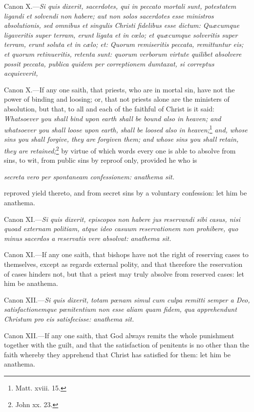 Canon X.—\emph{Si quis dixerit, sacerdotes, qui in peccato mortali sunt, potestatem ligandi et solvendi non habere; aut non solos sacerdotes esse ministros absolutionis, sed omnibus et singulis Christi fidelibus esse dictum: Quæcumque ligaveritis super terram, erunt ligata et in cœlo; et quæcumque solveritis super terram, erunt soluta et in cælo; et: Quorum remiseritis peccata, remittuntur eis; et quorum retinueritis, retenta sunt: quorum verborum virtute quilibet absolvere possit peccata, publica quidem per correptionem dumtaxat, si correptus acquieverit, }

Canon X.—If any one saith, that priests, who are in mortal sin, have not the power of binding and loosing; or, that not priests alone are the ministers of absolution, but that, to all and each of the faithful of Christ is it said: \emph{Whatsoever you shall bind upon earth shall be bound also in heaven; and whatsoever you shall loose upon earth, shall be loosed also in heaven;}\footnote{\par   Matt. xviii. 15.} \emph{and, whose sins you shall forgive, they are forgiven them; and whose sins you shall retain, they are retained;}\footnote{\par   John xx. 23.} by virtue of which words every one is able to absolve from sins, to wit, from public sins by reproof only, provided he who is

\emph{secreta vero per spontaneam confessionem: anathema sit.}

reproved yield thereto, and from secret sins by a voluntary confession: let him be anathema.

Canon XI.—\emph{Si quis dixerit, episcopos non habere jus reservandi sibi casus, nisi quoad externam politiam, atque ideo casuum reservationem non prohibere, quo minus sacerdos a reservatis vere absolvat: anathema sit.}

Canon XI.—If any one saith, that bishops have not the right of reserving cases to themselves, except as regards external polity, and that therefore the reservation of cases hinders not, but that a priest may truly absolve from reserved cases: let him be anathema.

Canon XII.—\emph{Si quis dixerit, totam pœnam simul cum culpa remitti semper a Deo, satisfactionemque pœnitentium non esse aliam quam fidem, qua apprehendunt Christum pro eis satisfecisse: anathema sit.}

Canon XII.—If any one saith, that God always remits the whole punishment together with the guilt, and that the satisfaction of penitents is no other than the faith whereby they apprehend that Christ has satisfied for them: let him be anathema.

